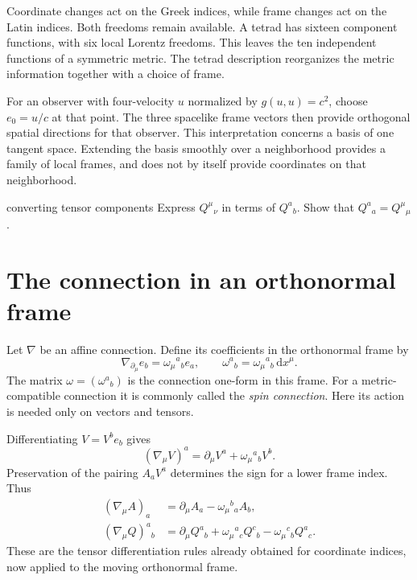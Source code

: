 \documentclass[11pt,a4paper]{article}
\numberwithin{equation}{section}
\newcommand{\dd}{\mathrm d}
\newcommand{\slideref}[1]{\par\nobreak\smallskip\nobreak{\footnotesize\color{ink!60}\textsc{Source slide #1}}\par\nobreak\smallskip\nobreak}
\begin{document}
Coordinate changes act on the Greek indices, while frame changes act
on the Latin indices. Both freedoms remain available. A tetrad has
sixteen component functions, with six local Lorentz freedoms. This
leaves the ten independent functions of a symmetric metric. The
tetrad description reorganizes the metric information together with
a choice of frame.

For an observer with four-velocity \(u\) normalized by
\(g(u,u)=c^2\), choose \(e_0=u/c\) at that point.
The three spacelike frame vectors then provide
orthogonal spatial directions for that observer. This interpretation
concerns a basis of one tangent space. Extending the basis smoothly
over a neighborhood provides a family of local frames, and does not
by itself provide coordinates on that neighborhood.

\begin{studentwork}[2.5cm]{converting tensor components}
Express \(Q^\mu{}_\nu\) in terms of \(Q^a{}_b\).
Show that \(Q^a{}_a=Q^\mu{}_\mu\).
\end{studentwork}

\section{The connection in an orthonormal frame}
\label{gr2:sec:spin-connection}
\slideref{17}

Let \(\nabla\) be an affine connection. Define its coefficients in the
orthonormal frame by
\begin{equation}
 \nabla_{\partial_\mu}e_b=\omega_\mu{}^a{}_b e_a,
 \qquad
 \omega^a{}_b=\omega_\mu{}^a{}_b\,\dd x^\mu.
 \label{gr2:eq:spin-definition}
\end{equation}
The matrix \(\omega=(\omega^a{}_b)\) is the connection one-form in this
frame. For a metric-compatible connection it is commonly called the
\emph{spin connection}. Here its action is needed only on vectors and tensors.

Differentiating \(V=V^b e_b\) gives
\begin{equation}
 (\nabla_\mu V)^a
 =\partial_\mu V^a+\omega_\mu{}^a{}_bV^b.
 \label{gr2:eq:frame-vector-derivative}
\end{equation}
Preservation of the pairing \(A_aV^a\) determines the sign for a lower
frame index. Thus
\begin{align}
 (\nabla_\mu A)_a
 &=\partial_\mu A_a-\omega_\mu{}^b{}_aA_b,\\
 (\nabla_\mu Q)^a{}_b
 &=\partial_\mu Q^a{}_b
   +\omega_\mu{}^a{}_cQ^c{}_b
   -\omega_\mu{}^c{}_bQ^a{}_c.
 \label{gr2:eq:frame-tensor-derivative}
\end{align}
These are the tensor differentiation rules already obtained for
coordinate indices, now applied to the moving orthonormal frame.
\end{document}
